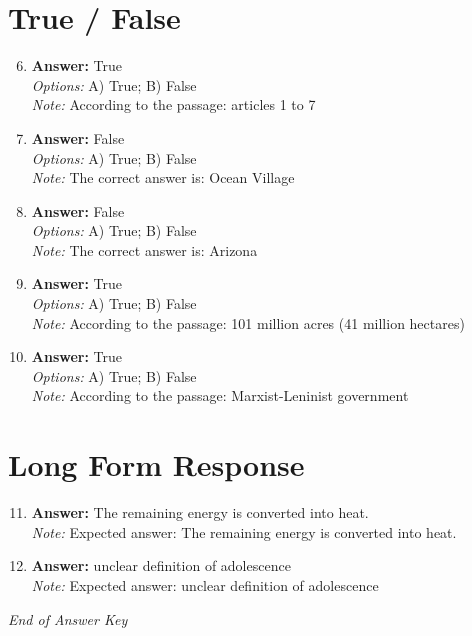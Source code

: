 \documentclass[12pt]{article}
\begin{document}
\section*{True / False}
\begin{enumerate}[label=\arabic*.]
\setcounter{enumi}{5}
\item \textbf{Answer:} True
\\ \textit{Options:} A) True; B) False
\\ \textit{Note:} According to the passage: articles 1 to 7
\item \textbf{Answer:} False
\\ \textit{Options:} A) True; B) False
\\ \textit{Note:} The correct answer is: Ocean Village
\item \textbf{Answer:} False
\\ \textit{Options:} A) True; B) False
\\ \textit{Note:} The correct answer is: Arizona
\item \textbf{Answer:} True
\\ \textit{Options:} A) True; B) False
\\ \textit{Note:} According to the passage: 101 million acres (41 million hectares)
\item \textbf{Answer:} True
\\ \textit{Options:} A) True; B) False
\\ \textit{Note:} According to the passage: Marxist-Leninist government
\end{enumerate}

\section*{Long Form Response}
\begin{enumerate}[label=\arabic*.]
\setcounter{enumi}{10}
\item \textbf{Answer:} The remaining energy is converted into heat.
\\ \textit{Note:} Expected answer: The remaining energy is converted into heat.
\item \textbf{Answer:} unclear definition of adolescence
\\ \textit{Note:} Expected answer: unclear definition of adolescence
\end{enumerate}

\vfill
\noindent\textit{End of Answer Key}
\end{document}
